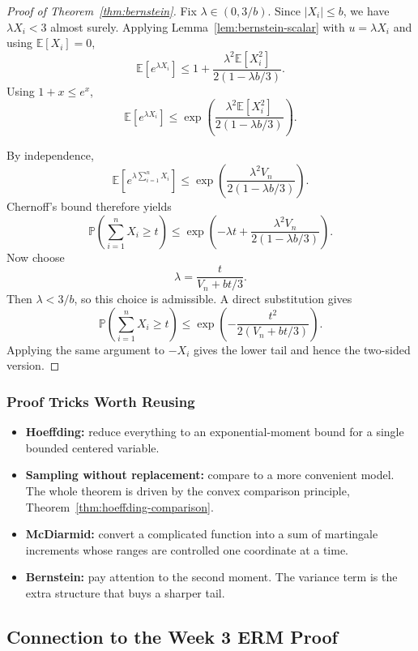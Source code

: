 \documentclass{article}
\theoremstyle{definition}
\theoremstyle{remark}
\newcommand{\EE}{\mathbb{E}}
\newcommand{\PP}{\mathbb{P}}
\begin{document}
\begin{proof}[Proof of Theorem~\ref{thm:bernstein}]
Fix $\lambda \in (0,3/b)$. Since $|X_i|\le b$, we have $\lambda X_i < 3$ almost surely. Applying Lemma~\ref{lem:bernstein-scalar} with $u=\lambda X_i$ and using $\EE[X_i]=0$,
$$
\EE[e^{\lambda X_i}]
\le
1 + \frac{\lambda^2 \EE[X_i^2]}{2(1-\lambda b/3)}.
$$
Using $1+x \le e^x$,
$$
\EE[e^{\lambda X_i}]
\le
\exp\!\left(
\frac{\lambda^2 \EE[X_i^2]}{2(1-\lambda b/3)}
\right).
$$

By independence,
$$
\EE\!\left[e^{\lambda \sum_{i=1}^n X_i}\right]
\le
\exp\!\left(
\frac{\lambda^2 V_n}{2(1-\lambda b/3)}
\right).
$$
Chernoff's bound therefore yields
$$
\PP\!\left(
\sum_{i=1}^n X_i \ge t
\right)
\le
\exp\!\left(
-\lambda t + \frac{\lambda^2 V_n}{2(1-\lambda b/3)}
\right).
$$
Now choose
$$
\lambda = \frac{t}{V_n + bt/3}.
$$
Then $\lambda < 3/b$, so this choice is admissible. A direct substitution gives
$$
\PP\!\left(
\sum_{i=1}^n X_i \ge t
\right)
\le
\exp\!\left(
-\frac{t^2}{2(V_n + bt/3)}
\right).
$$
Applying the same argument to $-X_i$ gives the lower tail and hence the two-sided version.
\end{proof}

\subsubsection{Proof Tricks Worth Reusing}

\begin{itemize}
\item \textbf{Hoeffding:} reduce everything to an exponential-moment bound for a single bounded centered variable.
\item \textbf{Sampling without replacement:} compare to a more convenient model. The whole theorem is driven by the convex comparison principle, Theorem~\ref{thm:hoeffding-comparison}.
\item \textbf{McDiarmid:} convert a complicated function into a sum of martingale increments whose ranges are controlled one coordinate at a time.
\item \textbf{Bernstein:} pay attention to the second moment. The variance term is the extra structure that buys a sharper tail.
\end{itemize}

\subsection{Connection to the Week 3 ERM Proof}
\end{document}
